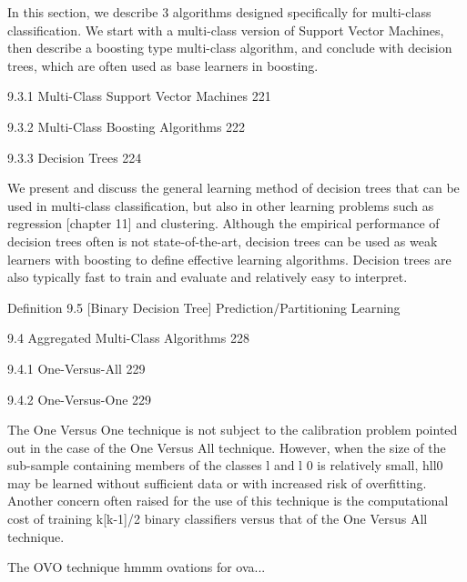 In this section, we describe 3 algorithms designed specifically for multi-class classification. We start with a multi-class version of Support Vector Machines, then describe a boosting type multi-class algorithm, and conclude with decision trees, which are often used as base learners in boosting.

9.3.1 Multi-Class Support Vector Machines 221



9.3.2 Multi-Class Boosting Algorithms 222



9.3.3 Decision Trees 224

We present and discuss the general learning method of decision trees that can be used in multi-class classification, but also in other learning problems such as regression [chapter 11] and clustering. Although the empirical performance of decision trees often is not state-of-the-art, decision trees can be used as weak learners with boosting to define effective learning algorithms. Decision trees are also typically fast to train and evaluate and relatively easy to interpret.

Definition 9.5 [Binary Decision Tree]
Prediction/Partitioning
Learning

9.4 Aggregated Multi-Class Algorithms 228



9.4.1 One-Versus-All 229



9.4.2 One-Versus-One 229

The One Versus One technique is not subject to the calibration problem pointed out in the case of the One Versus All technique. However, when the size of the sub-sample containing members of the classes l and l 0 is relatively small, hll0 may be learned without sufficient data or with increased risk of overfitting. Another concern often raised for the use of this technique is the computational cost of training k[k-1]/2 binary classifiers versus that of the One Versus All technique.

The OVO technique hmmm ovations for ova...


